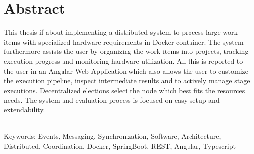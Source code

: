 
\chapter*{Abstract} %
 
 
 


This thesis if about implementing a distributed system to process large work items with specialized hardware requirements in Docker container.
The system furthermore assists the user by organizing the work items into projects, tracking execution progress and monitoring hardware utilization.
All this is reported to the user in an Angular Web-Application which also allows the user to customize the execution pipeline, inspect intermediate results and to actively manage stage executions.
Decentralized elections select the node which best fits the resources needs.
The system and evaluation process is focused on easy setup and extendability.

~\\
Keywords: Events, Messaging, Synchronization, Software, Architecture, Distributed, Coordination, Docker, SpringBoot, REST, Angular, Typescript